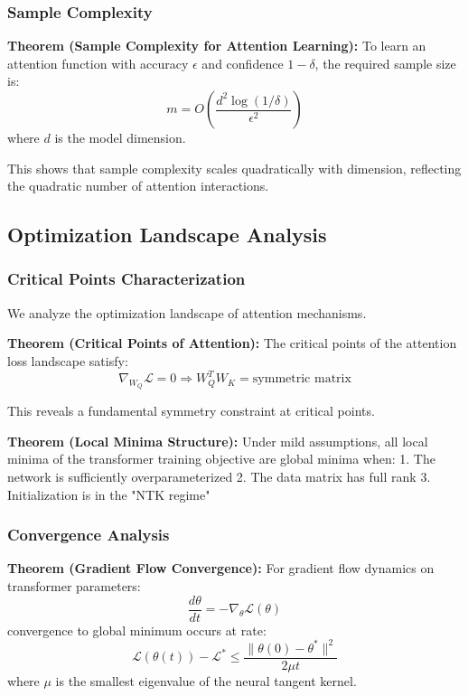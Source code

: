 \subsubsection{Sample Complexity}

\textbf{Theorem (Sample Complexity for Attention Learning):} To learn an attention function with accuracy $\epsilon$ and confidence $1-\delta$, the required sample size is:
\begin{equation}
m = O\left(\frac{d^2 \log(1/\delta)}{\epsilon^2}\right)
\end{equation}
where $d$ is the model dimension.

This shows that sample complexity scales quadratically with dimension, reflecting the quadratic number of attention interactions.

\subsection{Optimization Landscape Analysis}

\subsubsection{Critical Points Characterization}

We analyze the optimization landscape of attention mechanisms.

\textbf{Theorem (Critical Points of Attention):} The critical points of the attention loss landscape satisfy:
\begin{equation}
\nabla_{W_Q} \mathcal{L} = 0 \Rightarrow W_Q^T W_K = \text{symmetric matrix}
\end{equation}

This reveals a fundamental symmetry constraint at critical points.

\textbf{Theorem (Local Minima Structure):} Under mild assumptions, all local minima of the transformer training objective are global minima when:
1. The network is sufficiently overparameterized
2. The data matrix has full rank
3. Initialization is in the "NTK regime"

\subsubsection{Convergence Analysis}

\textbf{Theorem (Gradient Flow Convergence):} For gradient flow dynamics on transformer parameters:
\begin{equation}
\frac{d\theta}{dt} = -\nabla_\theta \mathcal{L}(\theta)
\end{equation}
convergence to global minimum occurs at rate:
\begin{equation}
\mathcal{L}(\theta(t)) - \mathcal{L}^* \leq \frac{\|\theta(0) - \theta^*\|^2}{2\mu t}
\end{equation}
where $\mu$ is the smallest eigenvalue of the neural tangent kernel.

